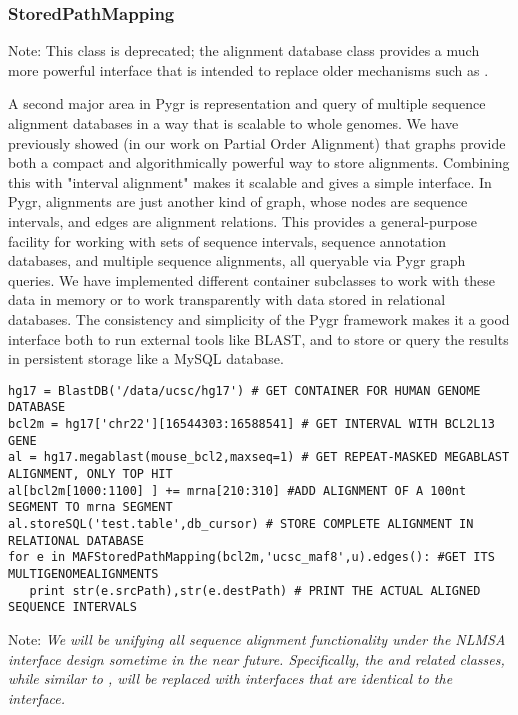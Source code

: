 \documentclass{howto}
\begin{document}
\subsubsection{StoredPathMapping}

Note: This class is deprecated; the  alignment database class provides
a much more powerful interface that is intended to replace older mechanisms
such as .

A second major area in Pygr is representation and query of multiple sequence alignment databases in a way that is scalable to whole genomes.  We have previously showed (in our work on Partial Order Alignment) that graphs provide both a compact and algorithmically powerful way to store alignments.  Combining this with "interval alignment" makes it scalable and gives a simple interface.  In Pygr, alignments are just another kind of graph, whose nodes are sequence intervals, and edges are alignment relations.  This provides a general-purpose facility for working with sets of sequence intervals, sequence annotation databases, and multiple sequence alignments, all queryable via Pygr graph queries.  We have implemented different container subclasses to work with these data in memory or to work transparently with data stored in relational databases.  The consistency and simplicity of the Pygr framework makes it a good interface both to run external tools like BLAST, and to store or query the results in persistent storage like a MySQL database.

\begin{verbatim}
hg17 = BlastDB('/data/ucsc/hg17') # GET CONTAINER FOR HUMAN GENOME DATABASE
bcl2m = hg17['chr22'][16544303:16588541] # GET INTERVAL WITH BCL2L13 GENE
al = hg17.megablast(mouse_bcl2,maxseq=1) # GET REPEAT-MASKED MEGABLAST ALIGNMENT, ONLY TOP HIT
al[bcl2m[1000:1100] ] += mrna[210:310] #ADD ALIGNMENT OF A 100nt SEGMENT TO mrna SEGMENT
al.storeSQL('test.table',db_cursor) # STORE COMPLETE ALIGNMENT IN RELATIONAL DATABASE
for e in MAFStoredPathMapping(bcl2m,'ucsc_maf8',u).edges(): #GET ITS MULTIGENOMEALIGNMENTS
   print str(e.srcPath),str(e.destPath) # PRINT THE ACTUAL ALIGNED SEQUENCE INTERVALS
\end{verbatim}

Note: {\em We will be unifying all sequence alignment functionality under the 
NLMSA interface design sometime in the near future.  Specifically, the
 and related classes, while similar to ,
will be replaced with interfaces that are identical to the 
interface.}
\end{document}
